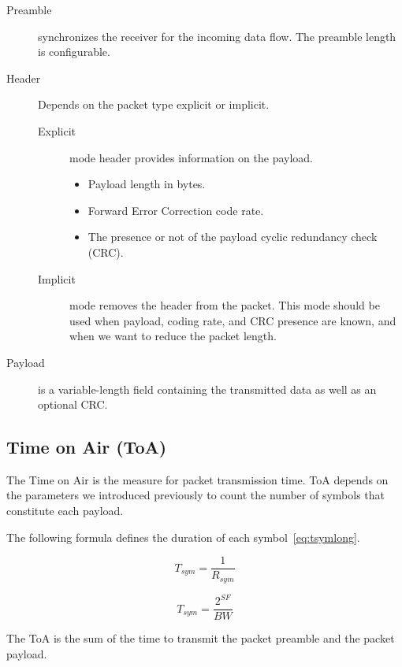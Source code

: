 \begin{description}
  \item[Preamble] synchronizes the receiver for the incoming data flow. The
    preamble length is configurable.
  \item[Header] Depends on the packet type explicit or implicit.
  \begin{description}
    \item[Explicit] mode header provides information on the payload.
    \begin{itemize}
      \item Payload length in bytes.
      \item Forward Error Correction code rate.
      \item The presence or not of the payload cyclic redundancy check (CRC).
    \end{itemize}
    \item[Implicit] mode removes the header from the packet. This mode should be
      used when payload, coding rate, and CRC presence are known, and when we want to
      reduce the packet length.
  \end{description}
  \item[Payload] is a variable-length field containing the transmitted data as
    well as an optional CRC.
\end{description}

\subsection{Time on Air (ToA)\label{section:toa}}

The Time on Air is the measure for packet transmission time.
ToA depends on the parameters we introduced previously to count the number of
symbols that constitute each payload.

The following formula defines the duration of each symbol~\ref{eq:tsymlong}.

\begin{equation}
  \label{eq:tsymlong}
  T_{sym} = \frac{1}{R_{sym}}
\end{equation}

\begin{equation}
  \label{eq:tsym}
  T_{sym} = \frac{2^{SF}}{BW}
\end{equation}

The ToA is the sum of the time to transmit the packet preamble and the packet
payload.

